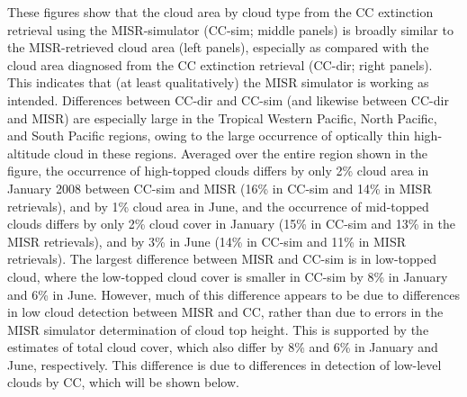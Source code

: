 These figures show that the cloud area by cloud type from the CC
extinction retrieval using the MISR-simulator (CC-sim; middle panels) is
broadly similar to the MISR-retrieved cloud area (left panels),
especially as compared with the cloud area diagnosed from the CC
extinction retrieval (CC-dir; right panels). This indicates that (at
least qualitatively) the MISR simulator is working as intended.
Differences between CC-dir and CC-sim (and likewise between CC-dir and
MISR) are especially large in the Tropical Western Pacific, North
Pacific, and South Pacific regions, owing to the large occurrence of
optically thin high-altitude cloud in these regions. Averaged over the
entire region shown in the figure, the occurrence of high-topped clouds
differs by only 2\% cloud area in January 2008 between CC-sim and MISR
(16\% in CC-sim and 14\% in MISR retrievals), and by 1\% cloud area in
June, and the occurrence of mid-topped clouds differs by only 2\% cloud
cover in January (15\% in CC-sim and 13\% in the MISR retrievals), and
by 3\% in June (14\% in CC-sim and 11\% in MISR retrievals). The largest
difference between MISR and CC-sim is in low-topped cloud, where the
low-topped cloud cover is smaller in CC-sim by 8\% in January and 6\% in
June. However, much of this difference appears to be due to differences
in low cloud detection between MISR and CC, rather than due to errors in
the MISR simulator determination of cloud top height. This is supported
by the estimates of total cloud cover, which also differ by 8\% and 6\%
in January and June, respectively. This difference is due to differences
in detection of low-level clouds by CC, which will be shown below.

